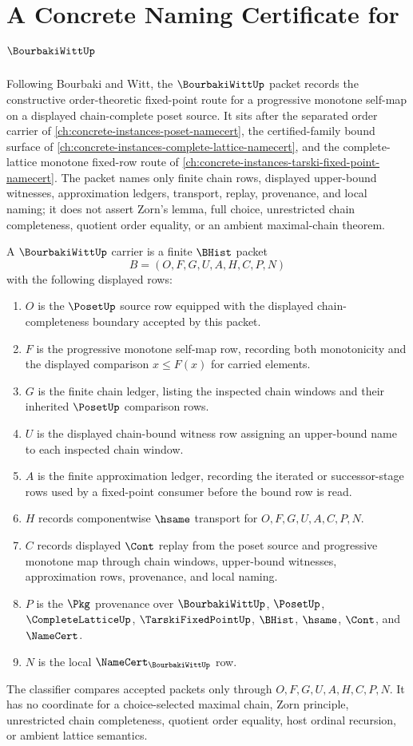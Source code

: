 \chapter{A Concrete Naming Certificate for $\BourbakiWittUp$}
\label{ch:concrete-instances-bourbaki-witt-namecert}

Following Bourbaki and Witt, the $\BourbakiWittUp$ packet records the constructive order-theoretic fixed-point route for a progressive monotone self-map on a displayed chain-complete poset source. It sits after the separated order carrier of \autoref{ch:concrete-instances-poset-namecert}, the certified-family bound surface of \autoref{ch:concrete-instances-complete-lattice-namecert}, and the complete-lattice monotone fixed-row route of \autoref{ch:concrete-instances-tarski-fixed-point-namecert}. The packet names only finite chain rows, displayed upper-bound witnesses, approximation ledgers, transport, replay, provenance, and local naming; it does not assert Zorn's lemma, full choice, unrestricted chain completeness, quotient order equality, or an ambient maximal-chain theorem.

\begin{definition}
\label{def:bourbaki-witt-carrier}
A $\BourbakiWittUp$ carrier is a finite $\BHist$ packet
$$
B=(O,F,G,U,A,H,C,P,N)
$$
with the following displayed rows:
\begin{enumerate}
\item $O$ is the $\PosetUp$ source row equipped with the displayed chain-completeness boundary accepted by this packet.
\item $F$ is the progressive monotone self-map row, recording both monotonicity and the displayed comparison $x \leq F(x)$ for carried elements.
\item $G$ is the finite chain ledger, listing the inspected chain windows and their inherited $\PosetUp$ comparison rows.
\item $U$ is the displayed chain-bound witness row assigning an upper-bound name to each inspected chain window.
\item $A$ is the finite approximation ledger, recording the iterated or successor-stage rows used by a fixed-point consumer before the bound row is read.
\item $H$ records componentwise $\hsame$ transport for $O,F,G,U,A,C,P,N$.
\item $C$ records displayed $\Cont$ replay from the poset source and progressive monotone map through chain windows, upper-bound witnesses, approximation rows, provenance, and local naming.
\item $P$ is the $\Pkg$ provenance over $\BourbakiWittUp$, $\PosetUp$, $\CompleteLatticeUp$, $\TarskiFixedPointUp$, $\BHist$, $\hsame$, $\Cont$, and $\NameCert$.
\item $N$ is the local $\NameCert_{\BourbakiWittUp}$ row.
\end{enumerate}
The classifier compares accepted packets only through $O,F,G,U,A,H,C,P,N$. It has no coordinate for a choice-selected maximal chain, Zorn principle, unrestricted chain completeness, quotient order equality, host ordinal recursion, or ambient lattice semantics.
\end{definition}

